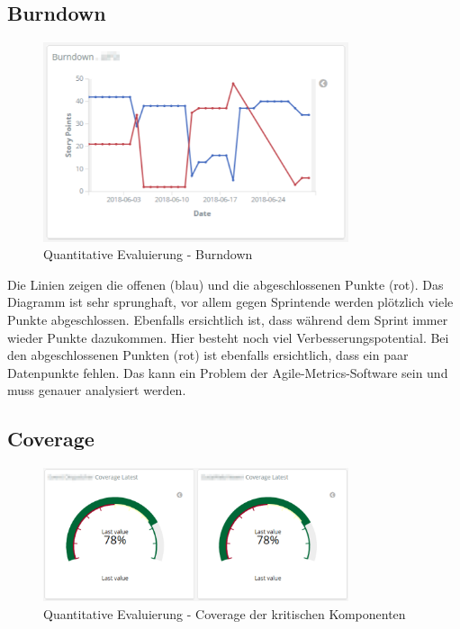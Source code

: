 \subsection*{Burndown}

\begin{savenotes}
    \begin{figure}[H]
      \centering
      \includegraphics[width=0.8\textwidth]{img/eval-burndown.png}
      \caption{Quantitative Evaluierung {-} Burndown}\label{fig:eval_burndown}
    \end{figure}
\end{savenotes}

Die Linien zeigen die offenen (blau) und die abgeschlossenen Punkte (rot).
Das Diagramm ist sehr sprunghaft, vor allem gegen Sprintende werden plötzlich viele Punkte abgeschlossen.
Ebenfalls ersichtlich ist, dass während dem Sprint immer wieder Punkte dazukommen.
Hier besteht noch viel Verbesserungspotential. Bei den abgeschlossenen Punkten (rot) ist ebenfalls ersichtlich, dass ein paar Datenpunkte fehlen.
Das kann ein Problem der Agile-Metrics-Software sein und muss genauer analysiert werden.

\clearpage
\subsection*{Coverage}

\begin{savenotes}
    \begin{figure}[H]
      \centering
      \includegraphics[width=0.8\textwidth]{img/eval-coverage-1.png}
      \caption{Quantitative Evaluierung {-} Coverage der kritischen Komponenten}\label{fig:eval_coverage_1}
    \end{figure}
\end{savenotes}

